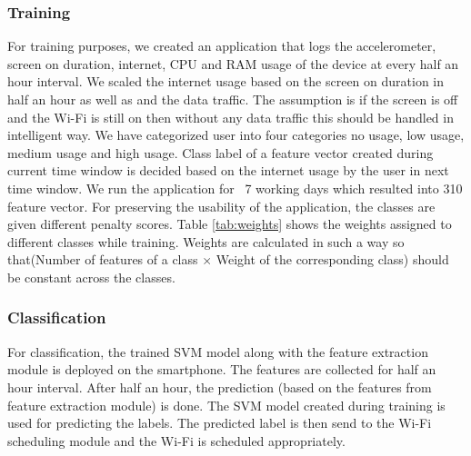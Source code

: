 \subsubsection{Training}
For training purposes, we created an application
that logs the accelerometer, screen on duration, internet, CPU and RAM usage of the device at every half an hour interval.
We scaled the internet usage based on
the screen on duration in half an hour as well as and the data traffic. The assumption is
if the screen is off and the Wi-Fi is still on then without any data traffic this should
be handled in intelligent way.
We have categorized user into four categories
no usage, low usage, medium usage
and high usage. Class label of a feature vector created during current time window is decided based on the internet usage by the user in next time window.
We run the application for ~7 working days which resulted into 310 feature vector.
For preserving the usability
of the application, the classes are  given different penalty
scores. Table \ref{tab:weights} shows the weights assigned to different classes while training. Weights are calculated in such a way so that(Number of features of a class $\times$ Weight of the corresponding class) should be constant across the classes.


\begin{table}[h]
\begin{center}
\end{center}
\end{table}
\subsubsection{Classification}
For classification, the trained SVM model along with the feature extraction module is deployed on the smartphone. The features are collected for half an hour interval. After half an hour, the prediction (based on the features from feature extraction module) is done. The SVM model created during training is used for predicting the labels. The predicted label is then send to the Wi-Fi scheduling module and the Wi-Fi is scheduled appropriately.

